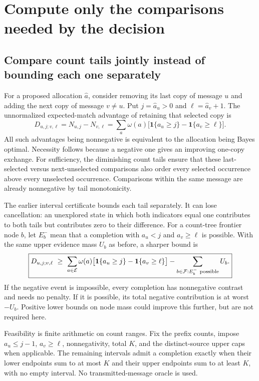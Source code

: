 \documentclass[10pt,a4paper]{article}
\newcommand{\ind}{\mathbf 1}
\begin{document}
\clearpage
\section{Compute only the comparisons needed by the decision}
\label{sec:decision-computation}
\subsection{Compare count tails jointly instead of bounding each one separately}
For a proposed allocation $\widehat a$, consider removing its last copy of message $u$ and adding the next copy
of message $v\ne u$. Put $j=\widehat a_u>0$ and $\ell=\widehat a_v+1$. The unnormalized expected-match advantage
of retaining that selected copy is
\begin{equation}
 D_{u,j;v,\ell}
 =N_{u,j}-N_{v,\ell}
 =\sum_a\omega(a)\big[\ind\{a_u\geq j\}-\ind\{a_v\geq\ell\}\big].
 \label{eq:decision-contrast}
\end{equation}
All such advantages being nonnegative is equivalent to the allocation being Bayes optimal.
Necessity follows because a negative one gives an improving one-copy exchange.
For sufficiency, the diminishing count tails ensure that these last-selected versus next-unselected comparisons
also order every selected occurrence above every unselected occurrence.
Comparisons within the same message are already nonnegative by tail monotonicity.

The earlier interval certificate bounds each tail separately. It can lose cancellation: an unexplored state
in which both indicators equal one contributes to both tails but contributes zero to their difference.
For a count-tree frontier node $b$, let $E_b^-$ mean that a completion with
$a_u<j$ and $a_v\geq\ell$ is possible. With the same upper evidence mass $U_b$ as before, a sharper bound is
\begin{equation}
 \boxed{D_{u,j;v,\ell}\ \geq\
 \sum_{a\in\mathcal E}\omega(a)
       \big[\ind\{a_u\geq j\}-\ind\{a_v\geq\ell\}\big]
 -\sum_{b\in\mathcal F:E_b^-\ {\rm possible}}U_b.}
 \label{eq:direct-contrast-bound}
\end{equation}
If the negative event is impossible, every completion has nonnegative contrast and needs no penalty.
If it is possible, its total negative contribution is at worst $-U_b$.
Positive lower bounds on node mass could improve this further, but are not required here.

Feasibility is finite arithmetic on count ranges. Fix the prefix counts, impose
$a_u\leq j-1$, $a_v\geq\ell$, nonnegativity, total $K$, and the distinct-source upper caps when applicable.
The remaining intervals admit a completion exactly when their lower endpoints sum to at most $K$ and their
upper endpoints sum to at least $K$, with no empty interval. No transmitted-message oracle is used.
\end{document}
